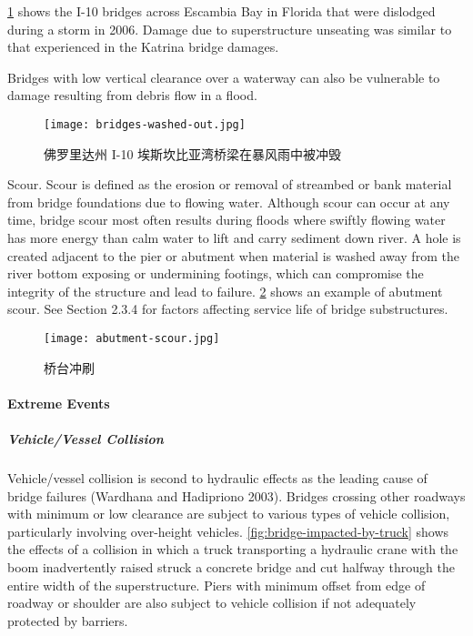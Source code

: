 \cref{fig:bridges-washed-out} shows the I-10 bridges across Escambia Bay in Florida that were dislodged during a storm in 2006.
Damage due to superstructure unseating was similar to that experienced in the Katrina bridge damages.

Bridges with low vertical clearance over a waterway can also be vulnerable to damage resulting from debris flow
in a flood.

\begin{figure}
  \texttt{[image: bridges-washed-out.jpg]}
  \caption{佛罗里达州 I-10 埃斯坎比亚湾桥梁在暴风雨中被冲毁}
  \label{fig:bridges-washed-out}
\end{figure}

Scour. Scour is defined as the erosion or removal of streambed or bank material from bridge foundations due to flowing water. Although scour can occur at any time, bridge scour most often results during floods where swiftly flowing water has more energy than calm water to lift and carry sediment down river. A hole is created adjacent to the pier or abutment when material is washed away from the river bottom exposing or undermining footings, which can compromise the integrity of the structure and lead to failure. \cref{fig:abutment-scour} shows an example of abutment scour. See Section 2.3.4 for factors affecting service life of bridge substructures.

\begin{figure}
  \texttt{[image: abutment-scour.jpg]}
  \caption{桥台冲刷}
  \label{fig:abutment-scour}
\end{figure}

\paragraph{Extreme Events}
\subparagraph{Vehicle/Vessel Collision}
Vehicle/vessel collision is second to hydraulic effects as the leading cause of bridge failures (Wardhana and Hadipriono 2003). Bridges crossing other roadways with minimum or low clearance are subject to various types of vehicle collision, particularly involving over-height vehicles. \cref{fig:bridge-impacted-by-truck} shows the effects of a collision in which a truck transporting a hydraulic crane with the boom inadvertently raised struck a concrete bridge and cut halfway through the entire width of the superstructure. Piers with minimum offset from edge of roadway or shoulder are also subject to vehicle collision if not adequately protected by barriers.

